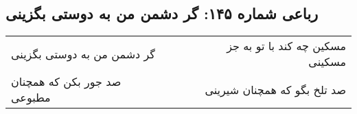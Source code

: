 \begin{center}
\section*{رباعی شماره ۱۴۵: گر دشمن من به دوستی بگزینی}
\label{sec:145}
\begin{longtable}{l p{0.5cm} r}
گر دشمن من به دوستی بگزینی
&&
مسکین چه کند با تو به جز مسکینی
\\
صد جور بکن که همچنان مطبوعی
&&
صد تلخ بگو که همچنان شیرینی
\\
\end{longtable}
\end{center}
